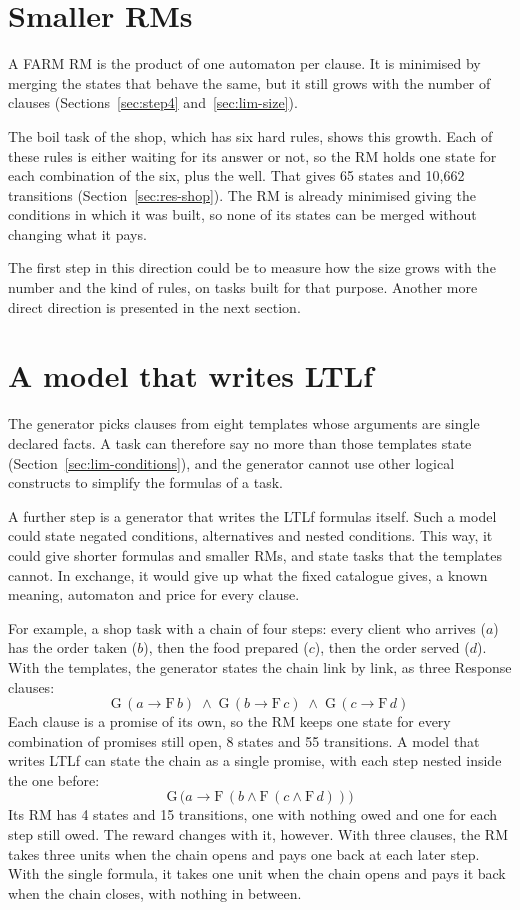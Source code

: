 \documentclass[11pt,english,listoffigures,listoftables]{tfgetsinf}
\begin{document}
\section{Smaller RMs}
\label{sec:fw-size}
A FARM RM is the product of one automaton per clause. It is minimised by merging the states that behave the same, but it still grows with the number of clauses (Sections~\ref{sec:step4} and~\ref{sec:lim-size}).

The boil task of the shop, which has six hard rules, shows this growth. Each of these rules is either waiting for its answer or not, so the RM holds one state for each combination of the six, plus the well. That gives 65 states and 10,662 transitions (Section~\ref{sec:res-shop}). The RM is already minimised giving the conditions in which it was built, so none of its states can be merged without changing what it pays.

The first step in this direction could be to measure how the size grows with the number and the kind of rules, on tasks built for that purpose. Another more direct direction is presented in the next section. 

\section{A model that writes LTLf}
\label{sec:fw-ltlf}
The generator picks clauses from eight templates whose arguments are single declared facts. A task can therefore say no more than those templates state (Section~\ref{sec:lim-conditions}), and the generator cannot use other logical constructs to simplify the formulas of a task.

A further step is a generator that writes the LTLf formulas itself. Such a model could state negated conditions, alternatives and nested conditions. This way, it could give shorter formulas and smaller RMs, and state tasks that the templates cannot. In exchange, it would give up what the fixed catalogue gives, a known meaning, automaton and price for every clause. 

For example, a shop task with a chain of four steps: every client who arrives ($a$) has the order taken ($b$), then the food prepared ($c$), then the order served ($d$). With the templates, the generator states the chain link by link, as three Response clauses:
\[
\mathrm{G}\,(a \rightarrow \mathrm{F}\,b) \;\wedge\; \mathrm{G}\,(b \rightarrow \mathrm{F}\,c) \;\wedge\; \mathrm{G}\,(c \rightarrow \mathrm{F}\,d)
\]
Each clause is a promise of its own, so the RM keeps one state for every combination of promises still open, 8 states and 55 transitions. A model that writes LTLf can state the chain as a single promise, with each step nested inside the one before:
\[
\mathrm{G}\,\bigl(a \rightarrow \mathrm{F}\,(b \wedge \mathrm{F}\,(c \wedge \mathrm{F}\,d))\bigr)
\]
Its RM has 4 states and 15 transitions, one with nothing owed and one for each step still owed. The reward changes with it, however. With three clauses, the RM takes three units when the chain opens and pays one back at each later step. With the single formula, it takes one unit when the chain opens and pays it back when the chain closes, with nothing in between.
\end{document}

